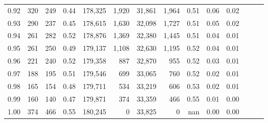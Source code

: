 \begin{tabular}{rrrrrrrrrrrrrr}
0.92 &    320 &  249 &  0.44 &  178,325 &    1,920 &  31,861 &   1,964 &  0.51 &  0.06 &      0.02 \\
0.93 &    290 &  237 &  0.45 &  178,615 &    1,630 &  32,098 &   1,727 &  0.51 &  0.05 &      0.02 \\
0.94 &    261 &  282 &  0.52 &  178,876 &    1,369 &  32,380 &   1,445 &  0.51 &  0.04 &      0.01 \\
0.95 &    261 &  250 &  0.49 &  179,137 &    1,108 &  32,630 &   1,195 &  0.52 &  0.04 &      0.01 \\
0.96 &    221 &  240 &  0.52 &  179,358 &      887 &  32,870 &     955 &  0.52 &  0.03 &      0.01 \\
0.97 &    188 &  195 &  0.51 &  179,546 &      699 &  33,065 &     760 &  0.52 &  0.02 &      0.01 \\
0.98 &    165 &  154 &  0.48 &  179,711 &      534 &  33,219 &     606 &  0.53 &  0.02 &      0.01 \\
0.99 &    160 &  140 &  0.47 &  179,871 &      374 &  33,359 &     466 &  0.55 &  0.01 &      0.00 \\
1.00 &    374 &  466 &  0.55 &  180,245 &        0 &  33,825 &       0 &   nan &  0.00 &      0.00 \\
\bottomrule
\end{tabular}
